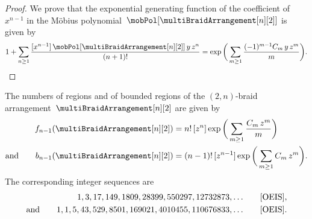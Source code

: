 \begin{proof}
We prove that the exponential generating function of the coefficient of~$x^{n-1}$ in the M\"obius polynomial~$\mobPol[{\multiBraidArrangement[n][2]}]$ is given by
\[
1 + \sum_{n \ge 1} \frac{[x^{n-1}] \, \mobPol[{\multiBraidArrangement[n][2]}] \, y \, z^n}{(n+1)!} = \exp \bigg( \sum_{m \ge 1} \frac{(-1)^{m-1} C_m \, y \, z^m}{m} \bigg).
\]
\end{proof}

\begin{corollary}
The numbers of regions and of bounded regions of the $(2,n)$-braid arrangement~$\multiBraidArrangement[n][2]$ are given by
\begin{align*}
f_{n-1}(\multiBraidArrangement[n][2]) 
& = n! \, [z^n] \exp \bigg( \sum_{m \ge 1} \frac{C_m \, z^m}{m} \bigg) \\
\text{and}\qquad
b_{n-1}(\multiBraidArrangement[n][2]) 
& = (n-1)! \, [z^{n-1}] \exp \bigg( \sum_{m \ge 1} C_m \, z^m \bigg).
\end{align*}
The corresponding integer sequences are
\begin{align*}
1, 3, 17, 149, 1809, 28399, 550297, 12732873, \dots & \qquad \text{\OEIS{A213507}}, \\
\text{and}\qquad
1, 1, 5, 43, 529, 8501, 169021, 4010455, 110676833, \dots & \qquad \text{\OEIS{A251568}}.
\end{align*}
\end{corollary}

